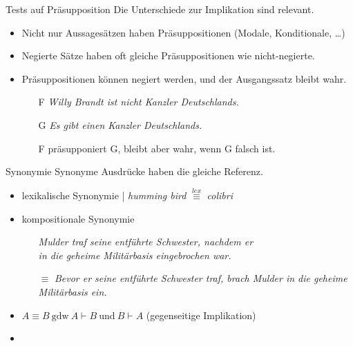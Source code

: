 \begin{frame}
  {Tests auf Präsupposition}
  \onslide<+->
  \onslide<+->
  Die Unterschiede zur Implikation sind relevant.\\
  \Halbzeile
  \begin{itemize}[<+->]
    \item Nicht nur Aussagesätzen haben Präsuppositionen (Modale, Konditionale, \ldots)
    \item Negierte Sätze haben oft gleiche Präsuppositionen wie nicht-negierte.
    \item Präsuppositionen können negiert werden, und der Ausgangssatz bleibt wahr.\\
      \begin{itemize}[<+->]
        \item[F] \textit{Willy Brandt ist nicht Kanzler Deutschlands.}
        \item[G] \textit{Es gibt einen Kanzler Deutschlands.}
        \item[ ] F präsupponiert G, bleibt aber wahr, wenn G falsch ist.
      \end{itemize}
  \end{itemize}
\end{frame}

\begin{frame}
  {Synonymie}
  \onslide<+->
  \onslide<+->
  Synonyme Ausdrücke haben  \alert{die gleiche Referenz}.\\
  \Halbzeile
  \begin{itemize}[<+->]
    \item lexikalische Synonymie | \textit{humming bird} $\stackrel{lex}{\equiv}$ \textit{colibri}
      \Halbzeile
    \item kompositionale Synonymie
      \begin{itemize}[<+->]
        \item[ ] \textit{Mulder traf seine entführte Schwester, nachdem er\\
          in die geheime Militärbasis eingebrochen war.}
        \item[$\equiv$] \textit{Bevor er seine entführte Schwester traf, brach Mulder in die geheime Militärbasis ein.}
      \end{itemize}
    \Halbzeile
    \item \alert{$A\equiv B\ \text{gdw}\ A\vdash B\ \text{und}\ B\vdash A$} (gegenseitige Implikation)
    \item {}
  \end{itemize}
\end{frame}

